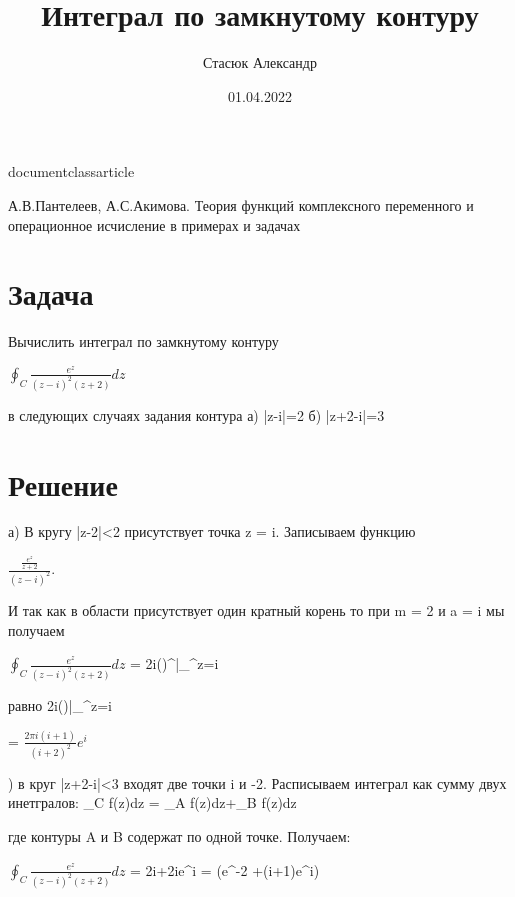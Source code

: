 documentclass{article}
\usepackage[russian]{babel}
\usepackage[utf8]{inputenc}
\usepackage{syntonly}%

\title{Интеграл по замкнутому контуру}
\author{Стасюк Александр}
\date{01.04.2022}



\maketitle
\begin{thebibliography}{1}

А.В.Пантелеев, А.С.Акимова. Теория функций комплексного переменного
и операционное исчисление в примерах и задачах

\end{thebibliography}
\section{Задача}

Вычислить интеграл по замкнутому контуру

$\oint_C \frac{e^z}{(z-i)^2(z+2)}dz$

в следующих случаях задания контура а) |z-i|=2 б) |z+2-i|=3

\section{Решение}

а) В кругу |z-2|<2 присутствует точка z = i. Записываем
функцию

$\frac{\frac{e^z}{z+2}}{(z-i)^2}$.

И так как в области присутствует один кратный корень то при m = 2 и a = i мы получаем

\par \noindent$\oint_C \frac{e^z}{(z-i)^2(z+2)}dz$ = 2\pi i()^\prime\bigg|_^z=i
\par{} равно 2\pi i()|_^z=i
\par\noindent= $\frac{2\pi i(i+1)}{(i+2)^2}e^i$
\par{}) в круг |z+2-i|<3 входят две точки i и -2. Расписываем интеграл как сумму двух инетгралов: \oint_C f(z)dz = \oint_A f(z)dz+\oint_B f(z)dz
\par\noindent где контуры A и B содержат по одной точке. Получаем:
\par\noindent$\oint_C \frac{e^z}{(z-i)^2(z+2)}dz$ = 2\pi i+2\pi ie^i = (e^-2 +(i+1)e^i)


